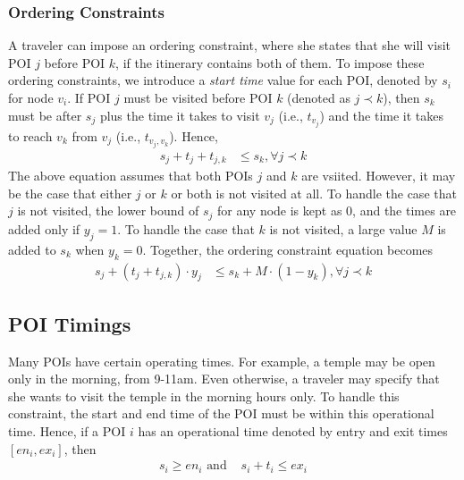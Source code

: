 \subsubsection{Ordering Constraints}
\label{eq:ordering}

A traveler can impose an ordering constraint, where she states that she will
visit POI $j$ before POI $k$, if the itinerary contains both of them.
To impose these ordering constraints, we introduce a \emph{start time} value for each POI, denoted by $s_i$ for node $v_i$.
If POI $j$ must be visited before POI $k$ (denoted as $j \prec k$), then $s_k$ must be after $s_j$ plus
the time it takes to visit $v_j$ (i.e., $t_{v_j}$) and the time it takes to
reach $v_k$ from $v_j$ (i.e., $t_{v_j,v_k}$).
Hence,
%
\begin{align}
	s_j + t_{j} + t_{j,k} & \leq s_k, \forall j \prec k
\end{align}
%
The above equation assumes that both POIs $j$ and $k$ are vsiited.
However, it may be the case that either $j$ or $k$ or both is not visited at all.
To handle the case that $j$ is not visited, the lower bound of $s_j$ for any
node is kept as $0$, and the times are added only if $y_j = 1$.
To handle the case that $k$ is not visited, a large value $M$ is added to $s_k$
when $y_k = 0$.
Together, the ordering constraint equation becomes
%
\begin{align}
	\label{eq:ordering}
	s_j + (t_{j} + t_{j,k}) \cdot y_j & \leq s_k + M \cdot (1 - y_k), \forall j \prec k
\end{align}
%

\subsection{POI Timings}

Many POIs have certain operating times.  For example, a temple may be open
only in the morning, from 9-11am.  Even otherwise, a traveler may specify that she wants to visit the temple in the morning hours only.  To handle this constraint, the start and
end time of the POI must be within this operational time.  Hence, if a POI
$i$ has an operational time denoted by entry and exit times $[en_i, ex_i]$,
then
%
\begin{align}
	\label{eq:operational}
	s_i \geq en_i \text{ and } & s_i + t_{i} \leq ex_i
\end{align}

